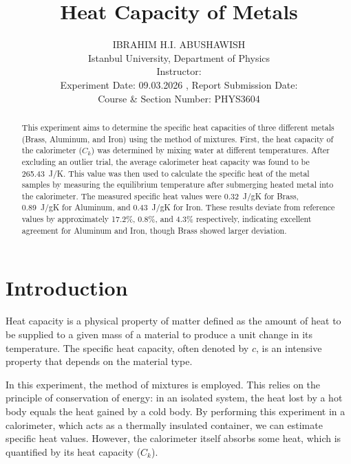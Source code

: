 \documentclass[journal]{IEEEtran}
\begin{document}
\title{Heat Capacity of Metals}
\author{IBRAHIM H.I. ABUSHAWISH \\
Istanbul University, Department of Physics \\
Instructor:  \\
Experiment Date: 09.03.2026 , Report Submission Date: \\
Course \& Section Number: PHYS3604}



\maketitle

\begin{abstract}
This experiment aims to determine the specific heat capacities of three different metals (Brass, Aluminum, and Iron) using the method of mixtures. First, the heat capacity of the calorimeter ($C_k$) was determined by mixing water at different temperatures. After excluding an outlier trial, the average calorimeter heat capacity was found to be \SI{265.43}{J/K}. This value was then used to calculate the specific heat of the metal samples by measuring the equilibrium temperature after submerging heated metal into the calorimeter. The measured specific heat values were \SI{0.32}{J/gK} for Brass, \SI{0.89}{J/gK} for Aluminum, and \SI{0.43}{J/gK} for Iron. These results deviate from reference values by approximately 17.2\%, 0.8\%, and 4.3\% respectively, indicating excellent agreement for Aluminum and Iron, though Brass showed larger deviation.
\end{abstract}

\section{Introduction}
Heat capacity is a physical property of matter defined as the amount of heat to be supplied to a given mass of a material to produce a unit change in its temperature. The specific heat capacity, often denoted by $c$, is an intensive property that depends on the material type.

In this experiment, the method of mixtures is employed. This relies on the principle of conservation of energy: in an isolated system, the heat lost by a hot body equals the heat gained by a cold body. By performing this experiment in a calorimeter, which acts as a thermally insulated container, we can estimate specific heat values. However, the calorimeter itself absorbs some heat, which is quantified by its heat capacity ($C_k$).
\end{document}
